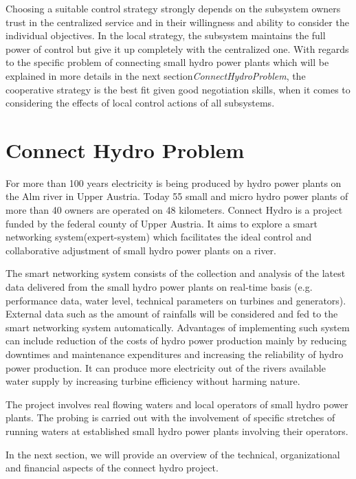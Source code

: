 Choosing a suitable control strategy strongly depends on the subsystem owners trust in the centralized service and in their willingness and ability to consider the individual objectives\cite{SEIT2017}. In the local strategy, the subsystem maintains the full power of control but give it up completely with the centralized one. With regards to the specific problem of connecting small hydro power plants which will be explained in more details in the next section\textit{ConnectHydroProblem}, the cooperative strategy is the best fit given good negotiation skills, when it comes to considering the effects of local control actions of all subsystems.\cite{SEIT2017}
\section{Connect Hydro Problem}
\label{ConnectHydroProblem}
For more than 100 years electricity is being produced by hydro power plants on the Alm river in Upper Austria. Today 55 small and micro hydro power plants of more than 40 owners are operated on 48 kilometers.\cite{SEIT2017} Connect Hydro is a project funded by the federal county of Upper Austria. It aims to explore a smart networking system(expert-system) which facilitates the ideal control and collaborative adjustment of small hydro power plants on a river.\cite{SEIT2017}

The smart networking system consists of the collection and analysis of the latest data delivered from the small hydro power plants on real-time basis (e.g. performance data, water level, technical parameters on turbines and generators).\cite{SEIT2017} External data such as the amount of rainfalls will be considered and fed to the smart networking system automatically. Advantages of implementing such system can include reduction of the costs of hydro power production mainly by reducing downtimes and maintenance expenditures and increasing the reliability of hydro power production. It can produce more electricity out of the rivers available water supply by increasing turbine efficiency without harming nature.\cite{SEIT2017} 

The project involves real flowing waters and local operators of small hydro power plants. The probing is carried out with the involvement of specific stretches of running waters at established small hydro power plants involving their operators.\cite{SEIT2017} 

In the next section, we will provide an overview of the technical, organizational and financial aspects of the connect hydro project. 
